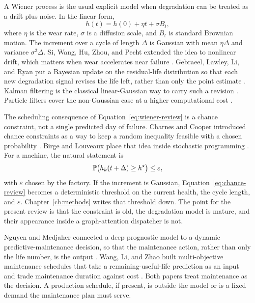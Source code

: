 A Wiener process is the usual explicit model when degradation can be treated as a drift plus noise. In the linear form,
\begin{equation}
h(t) = h(0) + \eta t + \sigma B_t,
\label{eq:wiener-review}
\end{equation}
where \(\eta\) is the wear rate, \(\sigma\) is a diffusion scale, and \(B_t\) is standard Brownian motion. The increment over a cycle of length \(\Delta\) is Gaussian with mean \(\eta\Delta\) and variance \(\sigma^2\Delta\). Si, Wang, Hu, Zhou, and Pecht extended the idea to nonlinear drift, which matters when wear accelerates near failure \cite{si2012}. Gebraeel, Lawley, Li, and Ryan put a Bayesian update on the residual-life distribution so that each new degradation signal revises the life left, rather than only the point estimate \cite{gebraeel2005}. Kalman filtering is the classical linear-Gaussian way to carry such a revision \cite{kalman1960}. Particle filters cover the non-Gaussian case at a higher computational cost \cite{arulampalam2002}.

The scheduling consequence of Equation~\eqref{eq:wiener-review} is a chance constraint, not a single predicted day of failure. Charnes and Cooper introduced chance constraints as a way to keep a random inequality feasible with a chosen probability \cite{charnes1959}. Birge and Louveaux place that idea inside stochastic programming \cite{birge2011}. For a machine, the natural statement is
\begin{equation}
\mathbb{P}\big(h_k(t+\Delta) \ge h^{\star}\big) \le \varepsilon,
\label{eq:chance-review}
\end{equation}
with \(\varepsilon\) chosen by the factory. If the increment is Gaussian, Equation~\eqref{eq:chance-review} becomes a deterministic threshold on the current health, the cycle length, and \(\varepsilon\). Chapter~\ref{ch:methods} writes that threshold down. The point for the present review is that the constraint is old, the degradation model is mature, and their appearance inside a graph-attention dispatcher is not.

Nguyen and Medjaher connected a deep prognostic model to a dynamic predictive-maintenance decision, so that the maintenance action, rather than only the life number, is the output \cite{nguyen2019}. Wang, Li, and Zhao built multi-objective maintenance schedules that take a remaining-useful-life prediction as an input and trade maintenance duration against cost \cite{wang2024cie}. Both papers treat maintenance as the decision. A production schedule, if present, is outside the model or is a fixed demand the maintenance plan must serve.

